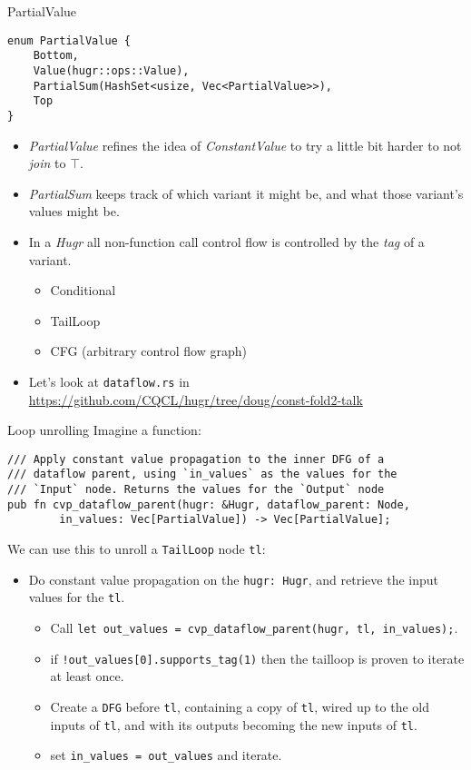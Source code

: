 \documentclass[presentation]{beamer}
\begin{document}
\begin{frame}[label={sec:org7ace7e2},fragile]{PartialValue}
 \begin{verbatim}
enum PartialValue {
    Bottom,
    Value(hugr::ops::Value),
    PartialSum(HashSet<usize, Vec<PartialValue>>),
    Top
}
\end{verbatim}

\begin{itemize}
\item \emph{PartialValue} refines the idea of \emph{ConstantValue} to try a little bit harder to not \emph{join} to \(\top\).

\item \emph{PartialSum} keeps track of which variant it might be, and what those variant's values might be.

\item In a \emph{Hugr} all non-function call control flow is controlled by the \emph{tag} of a variant.
\begin{itemize}
\item Conditional
\item TailLoop
\item CFG (arbitrary control flow graph)
\end{itemize}

\item Let's look at \texttt{dataflow.rs} in \url{https://github.com/CQCL/hugr/tree/doug/const-fold2-talk}
\end{itemize}
\end{frame}
\begin{frame}[label={sec:orgb41c7db},fragile]{Loop unrolling}
 Imagine a function:

\begin{verbatim}
/// Apply constant value propagation to the inner DFG of a
/// dataflow parent, using `in_values` as the values for the
/// `Input` node. Returns the values for the `Output` node
pub fn cvp_dataflow_parent(hugr: &Hugr, dataflow_parent: Node,
        in_values: Vec[PartialValue]) -> Vec[PartialValue];
\end{verbatim}

We can use this to unroll a \texttt{TailLoop} node \texttt{tl}:
\begin{itemize}
\item Do constant value propagation on the \texttt{hugr: Hugr}, and retrieve the input values for the \texttt{tl}.
\begin{itemize}
\item Call \texttt{let out\_values = cvp\_dataflow\_parent(hugr, tl, in\_values);}.
\item if \texttt{!out\_values[0].supports\_tag(1)} then the tailloop is proven to iterate at least once.
\item Create a \texttt{DFG} before \texttt{tl}, containing a copy of \texttt{tl}, wired up to the old inputs of \texttt{tl}, and with its
outputs becoming the new inputs of \texttt{tl}.
\item set \texttt{in\_values = out\_values} and iterate.
\end{itemize}
\end{itemize}
\end{frame}
\end{document}
